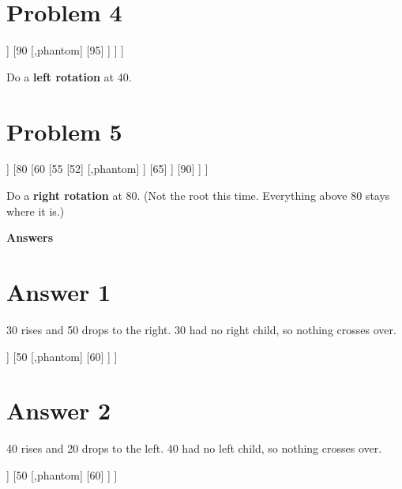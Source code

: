 \documentclass[11pt]{article}
\begin{document}
	\section*{Problem 4}
	\begin{center}
		\begin{forest}
			[40
			[20]
			[70
			[55
			[50]
			[,phantom]
			]
			[90
			[,phantom]
			[95]
			]
			]
			]
		\end{forest}
	\end{center}
	Do a \textbf{left rotation} at 40.
	
	\section*{Problem 5}
	\begin{center}
		\begin{forest}
			[50
			[30
			[20]
			[40]
			]
			[80
			[60
			[55
			[52]
			[,phantom]
			]
			[65]
			]
			[90]
			]
			]
		\end{forest}
	\end{center}
	Do a \textbf{right rotation} at 80. (Not the root this time. Everything above 80 stays where it is.)
	
	\newpage
	\begin{center}
		{\Large \textbf{Answers}}
	\end{center}
	
	\section*{Answer 1}
	30 rises and 50 drops to the right. 30 had no right child, so nothing crosses over.
	\begin{center}
		\begin{forest}
			[30
			[20
			[10]
			[,phantom]
			]
			[50
			[,phantom]
			[60]
			]
			]
		\end{forest}
	\end{center}
	
	\section*{Answer 2}
	40 rises and 20 drops to the left. 40 had no left child, so nothing crosses over.
	\begin{center}
		\begin{forest}
			[40
			[20
			[10]
			[,phantom]
			]
			[50
			[,phantom]
			[60]
			]
			]
		\end{forest}
	\end{center}
	
\end{document}
